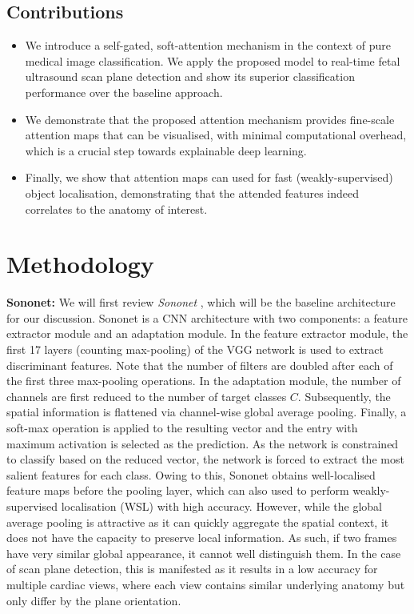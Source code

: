 \documentclass{article}
\begin{document}
\subsection{Contributions}

\begin{itemize}
\item We introduce a self-gated, soft-attention mechanism in the context of pure medical image classification. We apply the proposed model to real-time fetal ultrasound scan plane detection and show its superior classification performance over the baseline approach.

\item We demonstrate that the proposed attention mechanism provides fine-scale attention maps that can be visualised, with minimal computational overhead, which is a crucial step towards explainable deep learning.

\item Finally, we show that attention maps can used for fast (weakly-supervised) object localisation, demonstrating that the attended features indeed correlates to the anatomy of interest.
\end{itemize}

\section{Methodology}

\textbf{Sononet:} We will first review \emph{Sononet} \cite{baumgartner2016real}, which will be the baseline architecture for our discussion. Sononet is a CNN architecture with two components: a feature extractor module and an adaptation module. In the feature extractor module, the first 17 layers (counting max-pooling) of the VGG network \cite{simonyan2014very} is used to extract discriminant features. Note that the number of filters are doubled after each of the first three max-pooling operations. In the adaptation module, the number of channels are first reduced to the number of target classes $C$. Subsequently, the spatial information is flattened via channel-wise global average pooling. Finally, a soft-max operation is applied to the resulting vector and the entry with maximum activation is selected as the prediction. As the network is constrained to classify based on the reduced vector, the network is forced to extract the most salient features for each class. Owing to this, Sononet obtains well-localised feature maps before the pooling layer, which can also used to perform weakly-supervised localisation (WSL) with high accuracy. However, while the global average pooling is attractive as it can quickly aggregate the spatial context, it does not have the capacity to preserve local information. As such, if two frames have very similar global appearance, it cannot well distinguish them. In the case of scan plane detection, this is manifested as it results in a low accuracy for multiple cardiac views, where each view contains similar underlying anatomy but only differ by the plane orientation.
\end{document}
